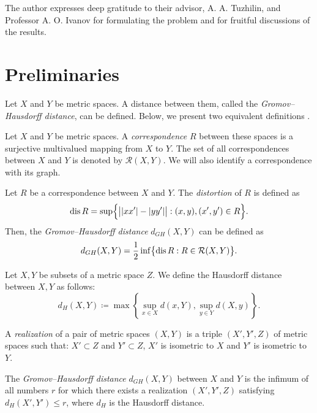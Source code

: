 \documentclass[leqno]{article}
\begin{document}
The author expresses deep gratitude to their advisor, A. A. Tuzhilin,
and Professor A. O. Ivanov for formulating the problem and for
fruitful discussions of the results.

\section{Preliminaries}

Let $ X $ and $ Y $ be metric spaces. A distance between them, called
the \emph{Gromov--Hausdorff distance}, can be defined. Below, we
present two equivalent definitions \cite{Lectures}.

\begin{defin}
  Let $ X $ and $ Y $ be metric spaces. A \emph{correspondence} $ R $
  between these spaces is a surjective multivalued mapping from $ X $
  to $ Y $. The set of all correspondences between $ X $ and $ Y $ is
  denoted by $ \mathcal{R}(X,Y) $. We will also identify a
  correspondence with its graph.
\end{defin}

\begin{defin}
  Let $ R $ be a correspondence between $ X $ and $ Y $. The
  \emph{distortion} of $ R $ is defined as
  $$
  \operatorname{dis}{R} = \sup \Bigl\{ \big| |xx'| - |yy'| \big| : (x, y), (x', y')
  \in R \Bigr\}.
  $$
  Then, the \emph{Gromov--Hausdorff distance} $ d_{GH}(X,Y) $ can be defined as
  $$
  d_{GH}(X,Y) = \frac{1}{2} \inf \bigl\{ \operatorname{dis}{R} : R \in
  \mathcal{R}(X,Y) \bigr\}.
  $$
  \label{defSootvet}
\end{defin}
\begin{defin}
  Let $X,Y$ be subsets of a metric space $Z$. We define the Hausdorff
  distance between $X,Y$ as follows:
  $$
  d_H(X, Y) \coloneqq \max \left\{ \sup_{x \in X} d(x, Y), \sup_{y
  \in Y} d(X, y) \right\}.
  $$
\end{defin}
\begin{defin}
  A \emph{realization} of a pair of metric spaces $ (X,Y) $ is a
  triple $ (X', Y', Z) $ of metric spaces such that:
  $ X' \subset Z $ and $ Y' \subset Z $,
  $ X' $ is isometric to $ X $ and
  $ Y' $ is isometric to $ Y $.

  The \emph{Gromov--Hausdorff distance} $ d_{GH}(X,Y) $ between $ X $
  and $ Y $ is the infimum of all numbers $ r $ for which there
  exists a realization $ (X', Y', Z) $ satisfying $ d_H(X', Y') \leq
  r $, where $ d_H $ is the Hausdorff distance.
\end{defin}
\end{document}
